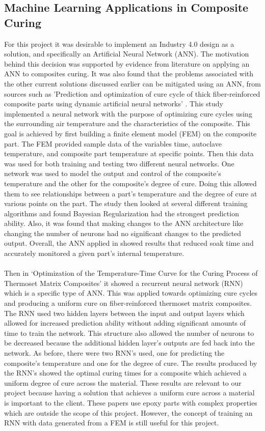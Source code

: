 \subsection{Machine Learning Applications in Composite Curing}
For this project it was desirable to implement an Industry 4.0 design as a solution, and specifically an Artificial Neural Network (ANN). The motivation behind this decision was supported by evidence from literature on applying an ANN to composites curing. It was also found that the problems associated with the other current solutions discussed earlier can be mitigated using an ANN, from sources such as ’Prediction and optimization of cure cycle of thick fiber-reinforced composite parts using dynamic artificial neural networks’ \cite{ann}. This study implemented a neural network with the purpose of optimizing cure cycles using the surrounding air temperature and the characteristics of the composite. This goal is achieved by first building a finite element model (FEM) on the composite part. The FEM provided sample data of the variables time, autoclave temperature, and composite part temperature at specific points. Then this data was used for both training and testing two different neural networks. One network was used to model the output and control of the composite’s temperature and the other for the composite’s degree of cure. Doing this allowed them to see relationships between a part’s temperature and the degree of cure at various points on the part. The study then looked at several different training algorithms and found Bayesian Regularization had the strongest prediction ability. Also, it was found that making changes to the ANN architecture like changing the number of neurons had no significant changes to the predicted output. Overall, the ANN applied in showed results that reduced soak time and accurately monitored a given part’s internal temperature.\\\\
Then in ‘Optimization of the Temperature-Time Curve for the Curing Process of Thermoset Matrix Composites’ \cite{rnn} it showed a recurrent neural network (RNN) which is a specific type of ANN. This was applied towards optimizing cure cycles and producing a uniform cure on fiber-reinforced thermoset matrix composites. The RNN used two hidden layers between the input and output layers which allowed for increased prediction ability without adding significant amounts of time to train the network. This structure also allowed the number of neurons to be decreased because the additional hidden layer’s outputs are fed back into the network. As before, there were two RNN’s used, one for predicting the composite’s temperature and one for the degree of cure. The results produced by the RNN’s showed the optimal curing times for a composite which achieved a uniform degree of cure across the material. These results are relevant to our project because having a solution that achieves a uniform cure across a material is important to the client. These papers use epoxy parts with complex properties which are outside the scope of this project. However, the concept of training an RNN with data generated from a FEM is still useful for this project.

